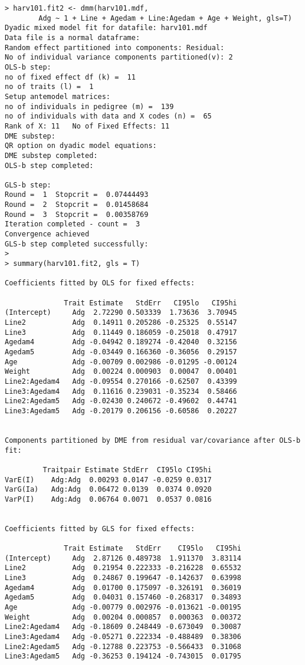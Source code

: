 \documentclass[titlepage]{article}  %
\begin{document}
\begin{verbatim}
> harv101.fit2 <- dmm(harv101.mdf,
        Adg ~ 1 + Line + Agedam + Line:Agedam + Age + Weight, gls=T)
Dyadic mixed model fit for datafile: harv101.mdf  
Data file is a normal dataframe:
Random effect partitioned into components: Residual:
No of individual variance components partitioned(v): 2 
OLS-b step:
no of fixed effect df (k) =  11 
no of traits (l) =  1 
Setup antemodel matrices:
no of individuals in pedigree (m) =  139 
no of individuals with data and X codes (n) =  65 
Rank of X: 11   No of Fixed Effects: 11 
DME substep:
QR option on dyadic model equations:
DME substep completed:
OLS-b step completed:

GLS-b step:
Round =  1  Stopcrit =  0.07444493 
Round =  2  Stopcrit =  0.01458684 
Round =  3  Stopcrit =  0.00358769 
Iteration completed - count =  3 
Convergence achieved
GLS-b step completed successfully:
>
> summary(harv101.fit2, gls = T)

Coefficients fitted by OLS for fixed effects:

              Trait Estimate   StdErr   CI95lo   CI95hi
(Intercept)     Adg  2.72290 0.503339  1.73636  3.70945
Line2           Adg  0.14911 0.205286 -0.25325  0.55147
Line3           Adg  0.11449 0.186059 -0.25018  0.47917
Agedam4         Adg -0.04942 0.189274 -0.42040  0.32156
Agedam5         Adg -0.03449 0.166360 -0.36056  0.29157
Age             Adg -0.00709 0.002986 -0.01295 -0.00124
Weight          Adg  0.00224 0.000903  0.00047  0.00401
Line2:Agedam4   Adg -0.09554 0.270166 -0.62507  0.43399
Line3:Agedam4   Adg  0.11616 0.239031 -0.35234  0.58466
Line2:Agedam5   Adg -0.02430 0.240672 -0.49602  0.44741
Line3:Agedam5   Adg -0.20179 0.206156 -0.60586  0.20227


Components partitioned by DME from residual var/covariance after OLS-b fit:

         Traitpair Estimate StdErr  CI95lo CI95hi
VarE(I)    Adg:Adg  0.00293 0.0147 -0.0259 0.0317
VarG(Ia)   Adg:Adg  0.06472 0.0139  0.0374 0.0920
VarP(I)    Adg:Adg  0.06764 0.0071  0.0537 0.0816


Coefficients fitted by GLS for fixed effects:

              Trait Estimate   StdErr    CI95lo   CI95hi
(Intercept)     Adg  2.87126 0.489738  1.911370  3.83114
Line2           Adg  0.21954 0.222333 -0.216228  0.65532
Line3           Adg  0.24867 0.199647 -0.142637  0.63998
Agedam4         Adg  0.01700 0.175097 -0.326191  0.36019
Agedam5         Adg  0.04031 0.157460 -0.268317  0.34893
Age             Adg -0.00779 0.002976 -0.013621 -0.00195
Weight          Adg  0.00204 0.000857  0.000363  0.00372
Line2:Agedam4   Adg -0.18609 0.248449 -0.673049  0.30087
Line3:Agedam4   Adg -0.05271 0.222334 -0.488489  0.38306
Line2:Agedam5   Adg -0.12788 0.223753 -0.566433  0.31068
Line3:Agedam5   Adg -0.36253 0.194124 -0.743015  0.01795



\end{verbatim}
\end{document}
